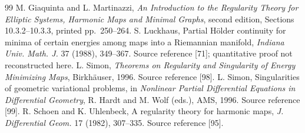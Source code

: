 \documentclass[11pt,a4paper]{article}
\numberwithin{equation}{section}
\theoremstyle{definition}
\theoremstyle{remark}
\begin{document}
\begin{thebibliography}{99}\small
{} M. Giaquinta and L. Martinazzi,
\emph{An Introduction to the Regularity Theory for Elliptic Systems,
Harmonic Maps and Minimal Graphs}, second edition,
Sections 10.3.2--10.3.3, printed pp.~250--264.
 S. Luckhaus,
Partial H\"older continuity for minima of certain energies among maps
into a Riemannian manifold, \emph{Indiana Univ. Math. J.} 37 (1988),
349--367. Source reference [71]; quantitative proof not reconstructed here.
 L. Simon,
\emph{Theorems on Regularity and Singularity of Energy Minimizing Maps},
Birkh\"auser, 1996. Source reference [98].
 L. Simon,
Singularities of geometric variational problems, in
\emph{Nonlinear Partial Differential Equations in Differential Geometry},
R. Hardt and M. Wolf (eds.), AMS, 1996. Source reference [99].
 R. Schoen and K. Uhlenbeck,
A regularity theory for harmonic maps, \emph{J. Differential Geom.}
17 (1982), 307--335. Source reference [95].
\end{thebibliography}
\end{document}
